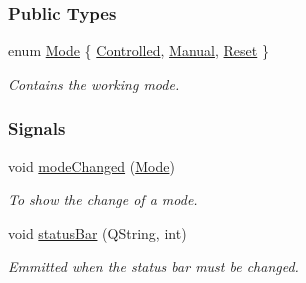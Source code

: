 \subsubsection*{Public Types}
\begin{DoxyCompactItemize}
\item 
enum \hyperlink{a00009_a8d581034e60792a9995d44065f6140a5}{Mode} \{ \hyperlink{a00009_a8d581034e60792a9995d44065f6140a5a7473f982355e53004aa4ec48482e0390}{Controlled}, 
\hyperlink{a00009_a8d581034e60792a9995d44065f6140a5ab07aa520bedb6453a76f5f05207bfc2c}{Manual}, 
\hyperlink{a00009_a8d581034e60792a9995d44065f6140a5aa4bd68ae9816441348750401b067bdf2}{Reset}
 \}
\begin{DoxyCompactList}\small\item\em Contains the working mode. \end{DoxyCompactList}\end{DoxyCompactItemize}
\subsubsection*{Signals}
\begin{DoxyCompactItemize}
\item 
void \hyperlink{a00009_a907b3805d113d09a945eb8f8d87851a7}{mode\+Changed} (\hyperlink{a00009_a8d581034e60792a9995d44065f6140a5}{Mode})
\begin{DoxyCompactList}\small\item\em To show the change of a mode. \end{DoxyCompactList}\item 
void \hyperlink{a00009_a3a3adc795d88624f86e13f2525e41106}{status\+Bar} (Q\+String, int)
\begin{DoxyCompactList}\small\item\em Emmitted when the status bar must be changed. \end{DoxyCompactList}\end{DoxyCompactItemize}
